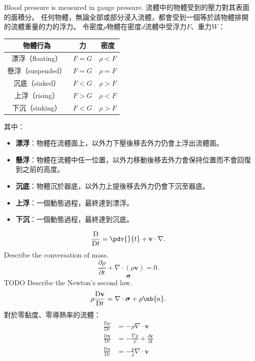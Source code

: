 \documentclass[a4paper,12pt]{article}
\begin{document}
Blood pressure is measured in gauge pressure.
流體中的物體受到的壓力對其表面的面積分。
任何物體，無論全部或部分浸入流體，都會受到一個等於該物體排開的流體重量的力的浮力。
令密度$\rho$物體在密度$d$流體中受浮力$F$、重力$W$：
\begin{longtable}[c]{|c|c|c|}
\hline
物體行為 & 力 & 密度 \\\hline\endhead
漂浮（floating） & $F=G$ & $\rho<F$ \\\hline
懸浮（suspended） & $F=G$ & $\rho=F$ \\\hline
沉底（sinked） & $F<G$ & $\rho>F$ \\\hline
上浮（rising） & $F>G$ & $\rho<F$ \\\hline
下沉（sinking） & $F<G$ & $\rho>F$ \\\hline
\end{longtable}\FB
其中：
\begin{itemize}
\item\textbf{漂浮}：物體在流體面上，以外力下壓後移去外力仍會上浮出流體面。
\item\textbf{懸浮}：物體在流體中任一位置，以外力移動後移去外力會保持位置而不會回復到之前的高度。
\item\textbf{沉底}：物體沉於器底，以外力上提後移去外力仍會下沉至器底。
\item\textbf{上浮}：一個動態過程，最終達到漂浮。
\item\textbf{下沉}：一個動態過程，最終達到沉底。
\end{itemize}
\[\frac{\mathrm{D}}{\mathrm{D}t}=\pdv{}{t}+\mathbf{v}\cdot\nabla.\]
Describe the conversation of mass.
\[\frac{\partial\rho}{\partial t}+\nabla\cdot(\rho\mathbf{v})=0.\]
\[\boldsymbol{\sigma}\]
TODO
Describe the Newton's second law.
\[\rho\frac{\mathrm{D}\mathbf{v}}{\mathrm{D} t}=\nabla\cdot\boldsymbol{\sigma}+\rho\mb{a}.\]
對於零黏度、零導熱率的流體：
\[\begin{aligned}
\frac{\mathrm{D}\rho}{\mathrm{D}t}&=-\rho\nabla\cdot\mathbf {v}\\
\frac{\mathrm{D}\mathbf{v}}{\mathrm{D}t}&=-\frac{\nabla p}{\rho}+\frac{\partial\mathbf{v}}{\partial t}\\
\frac{\mathrm{D}u}{\mathrm{D}t}&=-\frac{p}{\rho}\nabla\cdot\mathbf{v}
\end{aligned}\]
\end{document}
